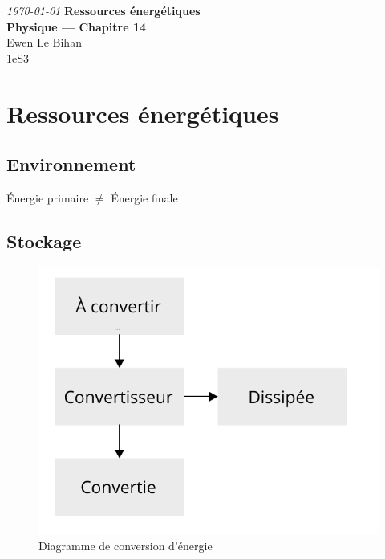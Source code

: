 \documentclass{article}
\begin{document}
\begin{titlepage}
\begin{center}
\textit{\today}
\vfill
\textbf{\LARGE{Ressources énergétiques}\\\Large{Physique --- Chapitre 14}}\\
\vfill
\large{Ewen Le Bihan\\1eS3}
\end{center}
\end{titlepage}

\section{Ressources énergétiques}
\subsection{Environnement}
Énergie primaire $\neq$ Énergie finale

\subsection{Stockage}
\begin{figure}[htp]
\centering
\includegraphics[scale=0.25]{Chap14_Fig1.png}
\caption{Diagramme de conversion d'énergie}
\label{conv}
\end{figure}
\end{document}
